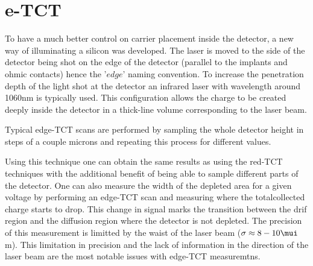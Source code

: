 

\section{e-TCT} %

To have a much better control on carrier placement inside the detector, a new way of illuminating a silicon was developed. The laser is moved to the side of the detector being shot on the edge of the detector (parallel to the implants and ohmic contacts) hence the '$edge$' naming convention. To increase the penetration depth of the light shot at the detector an infrared laser with wavelength around 1060nm is typically used. This configuration allows the charge to be created deeply inside the detector in a thick-line volume corresponding to the laser beam.

Typical edge-TCT scans are performed by sampling the whole detector height in steps of a couple microns and repeating this process for different \vias values.

Using this technique one can obtain the same results as using the red-TCT techniques with the additional benefit of being able to sample different parts of the detector. One can also measure the width of the depleted area for a given voltage by performing an edge-TCT scan and measuring where the totalcollected charge starts to drop. This change in signal marks the transition between the drif region and the diffusion region where the detector is not depleted. The precision of this measurement is limitted by the waist of the laser beam ($\sigma \approx 8-10\mui$ m). This limitation in precision and the lack of information in the direction of the laser beam are the most notable issues with edge-TCT measuremtns.

